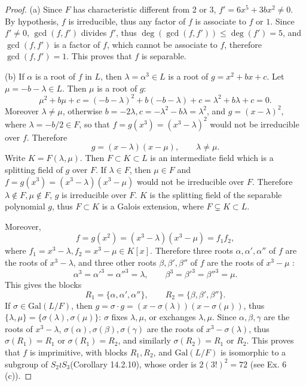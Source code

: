 \documentclass[11pt,a4paper]{article}
\newcommand{\Gal}{\mathrm{Gal}}
\begin{document}
\begin{proof}
\item[(a)] Since $F$ has characteristic different from 2 or 3, $f' = 6x^5 + 3bx^2 \ne 0$. By hypothesis, $f$ is irreducible, thus any factor of $f$ is associate to $f$ or $1$. Since $f' \ne 0$, $\gcd(f,f')$ divides $f'$, thus $\deg(\gcd(f,f')) \leq \deg(f') = 5$, and $\gcd(f,f')$ is a factor of $f$, which cannot be associate to $f$, therefore $\gcd(f,f') = 1$. This proves that $f$ is separable.
\item[(b)]  If $\alpha$ is a root of $f$ in $L$, then $ \lambda = \alpha^3 \in L $ is a root of $g = x^2 +bx+c$. Let $\mu = -b-\lambda \in L$. Then $\mu$ is a root of $g$: 
 $$\mu^2+b\mu+c = (-b-\lambda)^2 + b(-b-\lambda)+c = \lambda^2 + b\lambda + c = 0.$$
Moreover $\lambda \ne \mu$, otherwise $b = -2\lambda, c = -\lambda^2 - b\lambda = \lambda^2$, and $g = (x-\lambda)^2$, where $\lambda = -b/2 \in F$, so that  $f =g(x^3) = (x^3-\lambda)^2$ would not be irreducible over $f$. Therefore
$$g = (x- \lambda)(x-\mu),\qquad \lambda\ne \mu.$$
Write $K = F(\lambda,\mu)$. Then $F\subset K \subset L$ is an intermediate field which is a splitting field of $g$ over $F$.
If $\lambda \in F$, then $\mu \in F$ and $f = g(x^3) = (x^3 - \lambda)(x^3 - \mu)$ would not be irreducible over $F$. Therefore $\lambda \not \in F,\mu \not \in F$, $g$ is irreducible over $F$. $K$ is the splitting field of the separable polynomial $g$, thus $F \subset K$ is a Galois extension, where $F \subsetneq K \subset L$.

Moreover,
$$f = g(x^2) = (x^3 - \lambda)(x^3 - \mu) = f_1 f_2,$$
where $f_1 = x^3 - \lambda, f_2 = x^3 - \mu \in K[x]$.
Therefore three roots $\alpha,\alpha',\alpha''$ of $f$ are the roots of $x^3 -\lambda$, and three other roots $\beta,\beta',\beta''$ of $f$ are the roots of $x^3 - \mu$ :
$$\alpha^3 = \alpha'^3 = \alpha''^3 = \lambda,\qquad \beta^3 = \beta'^3 = \beta''^3 = \mu.$$
This gives the blocks
$$R_1 = \{\alpha, \alpha', \alpha''\},\qquad R_2 = \{\beta,\beta',\beta''\}.$$
If $\sigma \in \Gal(L/F)$, then $g = \sigma\cdot g = (x -\sigma(\lambda))(x - \sigma(\mu))$, thus $\{\lambda, \mu\} = \{\sigma(\lambda), \sigma(\mu)\}$: $\sigma$ fixes $\lambda, \mu$, or exchanges $\lambda, \mu$. Since $\alpha,\beta,\gamma$ are the roots of $x^3 - \lambda$, $\sigma(\alpha), \sigma(\beta), \sigma(\gamma)$ are the roots of $x^3 - \sigma(\lambda)$, thus $\sigma(R_1) = R_1$ or $\sigma(R_1) = R_2$, and similarly $\sigma(R_2) = R_1$ or $R_2$. This proves that $f$ is imprimitive, with blocks $R_1,R_2$, and $\Gal(L/F)$ is isomorphic to a subgroup of $S_2 \wr S_3$(Corollary 14.2.10), whose order is $2(3!)^2 = 72$ (see Ex. 6 (c)).


\end{proof}
\end{document}

